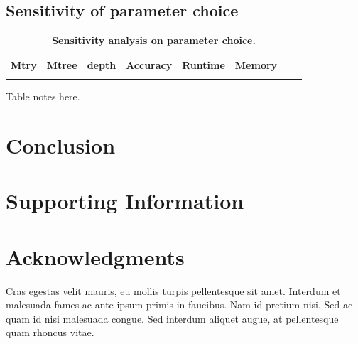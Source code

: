 \documentclass[10pt,a4paper]{article}  %
\begin{document}
\subsection{Sensitivity of parameter choice}

\begin{table}[!ht]
\caption{
{\bf Sensitivity analysis on parameter choice.}}
\begin{tabular}{|l|l|l|l|l|l|l|l|}
\hline
\bf{Mtry}  & \bf{Mtree} & \bf{depth} & \bf{Accuracy} & \bf{Runtime} & \bf{Memory} \\
\hline
&&&&&\\ \hline
\end{tabular}
\begin{flushleft} 
  Table notes here.
\end{flushleft}
\label{table2}
\end{table}




\section{Conclusion}




\section{Supporting Information}



\section*{Acknowledgments}
Cras egestas velit mauris, eu mollis turpis pellentesque sit amet. Interdum et malesuada fames ac ante ipsum primis in faucibus. Nam id pretium nisi. Sed ac quam id nisi malesuada congue. Sed interdum aliquet augue, at pellentesque quam rhoncus vitae.

\nolinenumbers


\end{document}
